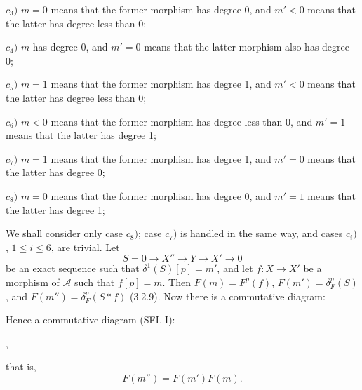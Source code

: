 \clearpage
{}%
\begingroup\small\setlength{\parskip}{0pt}\setlength{\emergencystretch}{1.5em}
\setlength{\abovedisplayskip}{4pt plus 2pt minus 2pt}%
\setlength{\belowdisplayskip}{4pt plus 2pt minus 2pt}%

\noindent$c_3)$ $m=0$ means that the former morphism has degree 0, and $m'<0$ means that the latter has degree less than 0;

\noindent$c_4)$ $m$ has degree 0, and $m'=0$ means that the latter morphism also has degree 0;

\noindent$c_5)$ $m=1$ means that the former morphism has degree 1, and $m'<0$ means that the latter has degree less than 0;

\noindent$c_6)$ $m<0$ means that the former morphism has degree less than 0, and $m'=1$ means that the latter has degree 1;

\noindent$c_7)$ $m=1$ means that the former morphism has degree 1, and $m'=0$ means that the latter has degree 0;

\noindent$c_8)$ $m=0$ means that the former morphism has degree 0, and $m'=1$ means that the latter has degree 1;

We shall consider only case $c_8)$; case $c_7)$ is handled in the same way,
and cases $c_i)$, $1\leq i\leq 6$, are trivial. Let
\[
S=0\longrightarrow X''\longrightarrow Y\longrightarrow X'\longrightarrow0
\]
be an exact sequence such that $\delta^1(S)[p]=m'$, and let
$f\colon X\longrightarrow X'$ be a morphism of $\mathcal A$ such that
$f[p]=m$. Then $F(m)=F^p(f)$, $F(m')=\delta_F^p(S)$, and
$F(m'')=\delta_F^p(S*f)$ (3.2.9). Now there is a commutative diagram:

\begin{center}
\end{center}
Hence a commutative diagram (SFL I):

\begin{center}
\hspace{1em},
\end{center}
that is,
\[
F(m'')=F(m')F(m).
\]

